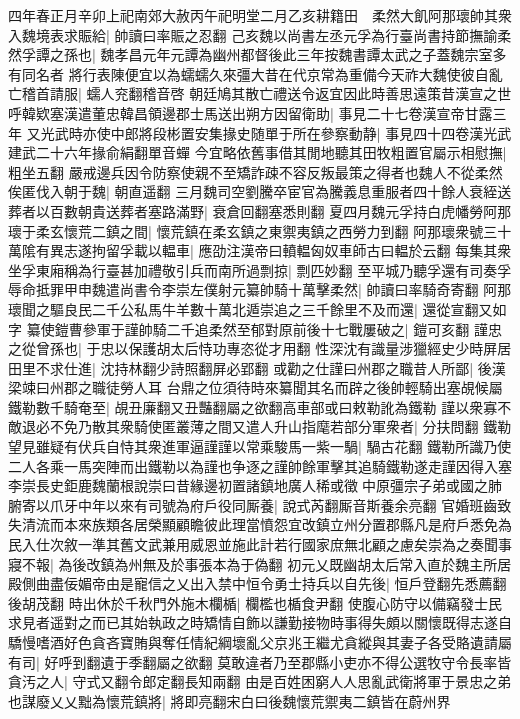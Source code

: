四年春正月辛卯上祀南郊大赦丙午祀明堂二月乙亥耕籍田　柔然大飢阿那瓌帥其衆入魏境表求賑給|{
	帥讀曰率賑之忍翻}
己亥魏以尚書左丞元孚為行臺尚書持節撫諭柔然孚譚之孫也|{
	魏孝昌元年元譚為幽州都督後此三年按魏書譚太武之子蓋魏宗室多有同名者}
將行表陳便宜以為蠕蠕久來彊大昔在代京常為重備今天祚大魏使彼自亂亡稽首請服|{
	蠕人兖翻稽音啓}
朝廷鳩其散亡禮送令返宜因此時善思遠策昔漢宣之世呼韓欵塞漢遣董忠韓昌領邊郡士馬送出朔方因留衛助|{
	事見二十七卷漢宣帝甘露三年}
又光武時亦使中郎將段彬置安集掾史随單于所在參察動静|{
	事見四十四卷漢光武建武二十六年掾俞絹翻單音蟬}
今宜略依舊事借其閒地聽其田牧粗置官屬示相慰撫|{
	粗坐五翻}
嚴戒邊兵因令防察使親不至矯詐疎不容反叛最策之得者也魏人不從柔然俟匿伐入朝于魏|{
	朝直遥翻}
三月魏司空劉騰卒宦官為騰義息重服者四十餘人衰絰送葬者以百數朝貴送葬者塞路滿野|{
	衰倉回翻塞悉則翻}
夏四月魏元孚持白虎幡勞阿那瓌于柔玄懷荒二鎮之間|{
	懷荒鎮在柔玄鎮之東禦夷鎮之西勞力到翻}
阿那瓌衆號三十萬隂有異志遂拘留孚載以輼車|{
	應劭注漢帝曰轒輼匈奴車師古曰輼於云翻}
每集其衆坐孚東廂稱為行臺甚加禮敬引兵而南所過剽掠|{
	剽匹妙翻}
至平城乃聽孚還有司奏孚辱命抵罪甲申魏遣尚書令李崇左僕射元纂帥騎十萬擊柔然|{
	帥讀曰率騎奇寄翻}
阿那瓌聞之驅良民二千公私馬牛羊數十萬北遁崇追之三千餘里不及而還|{
	還從宣翻又如字}
纂使鎧曹參軍于謹帥騎二千追柔然至郁對原前後十七戰屢破之|{
	鎧可亥翻}
謹忠之從曾孫也|{
	于忠以保護胡太后恃功專恣從才用翻}
性深沈有識量涉獵經史少時屏居田里不求仕進|{
	沈持林翻少詩照翻屏必郢翻}
或勸之仕謹曰州郡之職昔人所鄙|{
	後漢梁竦曰州郡之職徒勞人耳}
台鼎之位須待時來纂聞其名而辟之後帥輕騎出塞覘候屬鐵勒數千騎奄至|{
	覘丑廉翻又丑豔翻屬之欲翻高車部或曰敕勒訛為鐵勒}
謹以衆寡不敵退必不免乃散其衆騎使匿叢薄之間又遣人升山指麾若部分軍衆者|{
	分扶問翻}
鐵勒望見雖疑有伏兵自恃其衆進軍逼謹謹以常乘駿馬一紫一騧|{
	騧古花翻}
鐵勒所識乃使二人各乘一馬突陣而出鐵勒以為謹也争逐之謹帥餘軍擊其追騎鐵勒遂走謹因得入塞李崇長史鉅鹿魏蘭根說崇曰昔緣邊初置諸鎮地廣人稀或徵中原彊宗子弟或國之肺腑寄以爪牙中年以來有司號為府戶役同厮養|{
	說式芮翻厮音斯養余亮翻}
官婚班齒致失清流而本來族類各居榮顯顧瞻彼此理當憤怨宜改鎮立州分置郡縣凡是府戶悉免為民入仕次敘一準其舊文武兼用威恩並施此計若行國家庶無北顧之慮矣崇為之奏聞事寢不報|{
	為後改鎮為州無及於事張本為于偽翻}
初元乂既幽胡太后常入直於魏主所居殿側曲盡佞媚帝由是寵信之乂出入禁中恒令勇士持兵以自先後|{
	恒戶登翻先悉薦翻後胡茂翻}
時出休於千秋門外施木欄楯|{
	欄檻也楯食尹翻}
使腹心防守以備竊發士民求見者遥對之而已其始執政之時矯情自飾以謙勤接物時事得失頗以關懷既得志遂自驕慢嗜酒好色貪吝寶賄與奪任情紀綱壞亂父京兆王繼尤貪縱與其妻子各受賂遺請屬有司|{
	好呼到翻遺于季翻屬之欲翻}
莫敢違者乃至郡縣小吏亦不得公選牧守令長率皆貪汚之人|{
	守式又翻令郎定翻長知兩翻}
由是百姓困窮人人思亂武衛將軍于景忠之弟也謀廢乂乂黜為懷荒鎮將|{
	將即亮翻宋白曰後魏懷荒禦夷二鎮皆在蔚州界}
